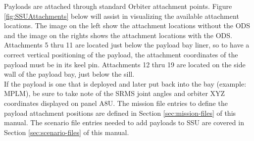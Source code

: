 \documentclass[13pt]{article}
\begin{document}
\begin{multicols*}{2}
Payloads are attached through standard Orbiter attachment points. Figure \ref{fig:SSUAttachments} below will assist in visualizing the available attachment locations. The image on the left show the attachment locations without the ODS and the image on the rights shows the attachment locations with the ODS. Attachments 5 thru 11 are located just below the payload bay liner, so to have a correct vertical positioning of the payload, the attachment coordinates of the payload must be in its keel pin. Attachments 12 thru 19 are located on the side wall of the payload bay, just below the sill.\\
If the payload is one that is deployed and later put back into the bay (example: MPLM), be sure to take note of the SRMS joint angles and orbiter XYZ coordinates displayed on panel A8U.
The mission file entries to define the payload attachment positions are defined in Section \ref{sec:mission-files} of this manual.
The scenario file entries needed to add payloads to SSU are covered in Section \ref{sec:scenario-files} of this manual. \\

\newpage

\end{multicols*}
\end{document}
